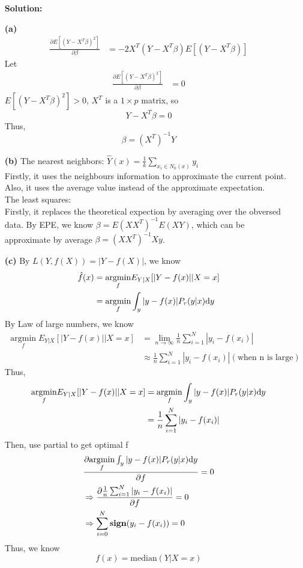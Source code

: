 \documentclass[10pt]{article}
\begin{document}
\begin{enumerate}[1.]
\textbf{Solution:}
	\item[\textbf{(a)}] 
	$$
	\begin{aligned}
	\frac{\partial E[(Y-X^T\beta)^2]}{\partial \beta} &= -2X^T(Y-X^T\beta)E[(Y-X^T\beta)] 
	\end{aligned} 
	$$
	Let 
	$$
	\begin{aligned}
	\frac{\partial E[(Y-X^T\beta)^2]}{\partial \beta} &= 0
	\end{aligned} 
	$$
	$E[(Y-X^T\beta)^2]>0$, $X^T$ is a $1\times p$ matrix, so
	$$Y-X^T\beta =0$$
	Thus,
		$$\beta = (X^T)^{-1}Y$$
	\item[\textbf{(b)}] The nearest neighbors: $\hat{Y}(x)=\frac{1}{k}\sum_{x_i\in N_k(x)}y_i$
		  \\Firstly, it uses the neighbours information to approximate the current point. Also, it uses the average value instead of the approximate expectation.
		  \\The least squares: 
		  \\Firstly, it replaces the theoretical expection by averaging over the obversed data. By EPE, we know $\beta = E(XX^T)^{-1}E(XY)$, which can be approximate by average $\beta = (XX^T)^{-1}Xy$. 
	\item[\textbf{(c)}] 
			By $L(Y,f(X))=|Y-f(X)|$, we know 
			$$
			\begin{aligned}
				\hat{f}(x) &= \underset{f}{\operatorname{argmin}}E_{Y|X}[|Y-f(x)||X=x]
				\\&= \underset{f}{\operatorname{argmin}}\int_y|y-f(x)|P_r(y|x)\mathrm{d}y
			\end{aligned} 
			$$
			By Law of large numbers, we know 
			$$
			\begin{aligned}
				\underset{f}{\operatorname{argmin}}E_{Y|X}[|Y-f(x)||X=x]
				&= \lim_{n\rightarrow \infty}\frac{1}{n}\sum_{i=1}^N|y_i-f(x_i)|
				\\&\approx \frac{1}{n}\sum_{i=1}^N|y_i-f(x_i)|(\text{when n is large})
			\end{aligned} 
			$$
			Thus,
			$$
			\begin{aligned}
				\underset{f}{\operatorname{argmin}}E_{Y|X}[|Y-f(x)||X=x]
				&= \underset{f}{\operatorname{argmin}}\int_y|y-f(x)|P_r(y|x)\mathrm{d}y
				\\&= \frac{1}{n}\sum_{i=1}^N|y_i-f(x_i)|
			\end{aligned} 
			$$
			Then, use partial to get optimal f
			$$
			\begin{aligned}
				&\frac{\partial \underset{f}{\operatorname{argmin}}\int_y|y-f(x)|P_r(y|x)\mathrm{d}y}{\partial f}=0
				\\&\Rightarrow \frac{\partial \frac{1}{n}\sum_{i=1}^N|y_i-f(x_i)|}{\partial f}=0
				\\&\Rightarrow \sum_{i=0}^N \mathop{\bf sign} (y_i-f(x_i))=0
			\end{aligned} 
			$$
			Thus, we know $$f(x) = \text{median}(Y|X=x)$$
			\newpage


\end{enumerate}
\end{document}
